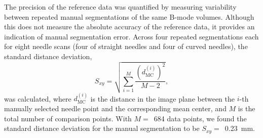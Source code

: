 The precision of the reference data was quantified by measuring variability between repeated manual segmentations of the same B-mode volumes. Although this does not measure the absolute accuracy of the reference data, it provides an indication of manual segmentation error. Across four repeated segmentations each for eight needle scans (four of straight needles and four of curved needles), the standard distance deviation, 
\begin{equation}
S_{xy} = \sqrt{      \sum_{i=1}^{M} \frac{(d^{(i)}_{\text{MC}})^2}{M-2}       },
\end{equation}
\noindent was calculated, where $d^{(i)}_{\text{MC}}$ is the distance in the image plane between the $i$-th manually selected needle point and the corresponding mean center, and $M$ is the total number of comparison points. With $M =$~684 data points, we found the standard distance deviation for the manual segmentation to be $S_{xy} =$~0.23~mm.

